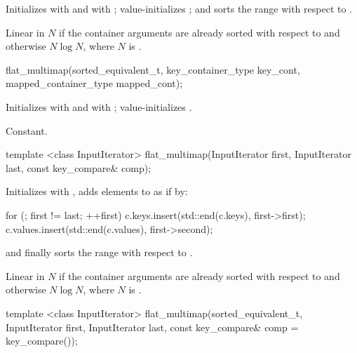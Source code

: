 \begin{addedblock}
\begin{itemdescr}
\pnum
\effects Initializes  with  and
 with ; value-initializes
; and sorts the range  with respect to
.

\pnum
\complexity
Linear in $N$ if the container arguments are already sorted with respect
to  and otherwise $N \log N$, where $N$
is .
\end{itemdescr}

%
\begin{itemdecl}
flat_multimap(sorted_equivalent_t, key_container_type key_cont,
              mapped_container_type mapped_cont);
\end{itemdecl}

\begin{itemdescr}
\pnum
\effects Initializes  with
 and  with
; value-initializes .

\pnum
\complexity
Constant.
\end{itemdescr}

%
\begin{itemdecl}
template <class InputIterator>
  flat_multimap(InputIterator first, InputIterator last, const key_compare& comp);
\end{itemdecl}

\begin{itemdescr}
\pnum
\effects Initializes  with , adds elements to
 as if by:
\begin{codeblock}
for (; first != last; ++first) {
  c.keys.insert(std::end(c.keys), first->first);
  c.values.insert(std::end(c.values), first->second);
}
\end{codeblock}
and finally sorts the range  with respect to .

\pnum
\complexity
Linear in $N$ if the container arguments are already sorted with respect to
 and otherwise $N \log N$, where $N$ is
.
\end{itemdescr}

%
\begin{itemdecl}
template <class InputIterator>
  flat_multimap(sorted_equivalent_t, InputIterator first, InputIterator last,
                const key_compare& comp = key_compare());
\end{itemdecl}


\end{addedblock}
